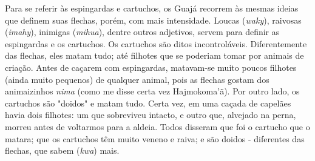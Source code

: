 Para se referir às espingardas e cartuchos, os Guajá recorrem às mesmas
ideias que definem suas flechas, porém, com mais intensidade. Loucas
(\emph{waky}), raivosas (\emph{imahy}), inimigas (\emph{mihua}), dentre
outros adjetivos, servem para definir as espingardas e os cartuchos. Os
cartuchos são ditos incontroláveis. Diferentemente das flechas, eles
matam tudo; até filhotes que se poderiam tomar por animais de criação.
Antes de caçarem com espingardas, matavam-se muito poucos filhotes
(ainda muito pequenos) de qualquer animal, pois as flechas gostam dos
animaizinhos \emph{nima} (como me disse certa vez Hajmokoma'ã). Por
outro lado, os cartuchos são "doidos" e matam tudo. Certa vez, em uma
caçada de capelães havia dois filhotes: um que sobreviveu intacto, e
outro que, alvejado na perna, morreu antes de voltarmos para a aldeia.
Todos disseram que foi o cartucho que o matara; que os cartuchos têm
muito veneno e raiva; e são doidos - diferentes das flechas, que sabem
(\emph{kwa}) mais.

